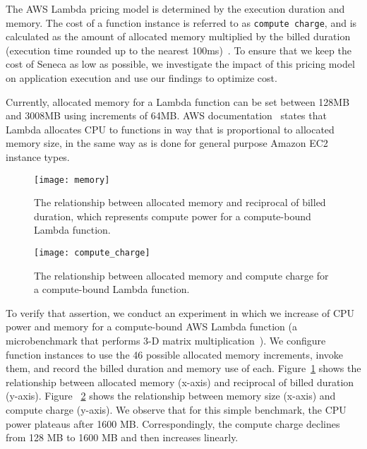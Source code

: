 The AWS Lambda pricing model is determined by the execution duration 
and memory. The cost of a function instance is referred to as 
\texttt{compute charge}, and is calculated as the amount of 
allocated memory multiplied by the
billed duration (execution time rounded up to the 
nearest 100ms)~\cite{ref:pricing}.
To ensure that we keep the cost of Seneca as low as possible, we investigate
the impact of this pricing model on application execution and use
our findings to optimize cost.

Currently, allocated memory for a Lambda function can be set
between 128MB and 3008MB using increments of 64MB.
AWS documentation~\cite{ref:lambdalimits} states that Lambda 
allocates CPU to functions in way that is proportional to allocated memory size,
in the same way as is done for general purpose Amazon EC2 instance types.

\begin{figure}[t] \centering 
\texttt{[image: memory]}
\caption{The relationship between allocated memory and reciprocal of billed duration, which represents compute power for a compute-bound Lambda function.
\label{fig:memory}}
\end{figure}

\begin{figure}[t] \centering 
\texttt{[image: compute\_charge]}
\caption{The relationship between allocated memory and compute charge for a compute-bound Lambda function.
\label{fig:compute_charge}}
\end{figure}


To verify that assertion, we conduct an experiment in which
we increase of CPU power and memory for a compute-bound 
AWS Lambda function (a microbenchmark that performs 3-D matrix multiplication~\cite{ref:matrix}).
We configure function instances to use the 46 possible allocated 
memory increments, invoke them, and record the billed duration and memory
use of each.
Figure~\ref{fig:memory} shows the relationship between allocated memory (x-axis) and reciprocal of billed duration (y-axis). 
Figure ~\ref{fig:compute_charge} shows the relationship between memory 
size (x-axis) and compute charge (y-axis). 
We observe that for this simple benchmark,
the CPU power plateaus after 1600 MB. 
Correspondingly, the compute charge declines from 128 MB to 1600 MB 
and then increases linearly. 


